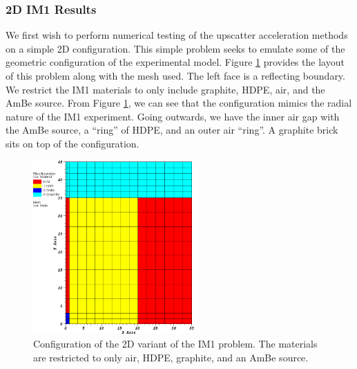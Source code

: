 \subsubsection{2D IM1 Results}
\label{sec::DSA_Results_IM1_2D}

We first wish to perform numerical testing of the upscatter acceleration methods on a simple 2D configuration. This simple problem seeks to emulate some of the geometric configuration of the experimental model. Figure \ref{fig::IM1_config_2D} provides the layout of this problem along with the mesh used. The left face is a reflecting boundary. We restrict the IM1 materials to only include graphite, HDPE, air, and the AmBe source. From Figure \ref{fig::IM1_config_2D}, we can see that the configuration mimics the radial nature of the IM1 experiment. Going outwards, we have the inner air gap with the AmBe source, a ``ring'' of HDPE, and an outer air ``ring''. A graphite brick sits on top of the configuration.

\begin{figure}
\centering
\includegraphics[width=0.55\textwidth]{figures/sec_DSA/2D_IM1_Variant_Layout.png}
\caption{Configuration of the 2D variant of the IM1 problem. The materials are restricted to only air, HDPE, graphite, and an AmBe source.}
\label{fig::IM1_config_2D}
\end{figure}

